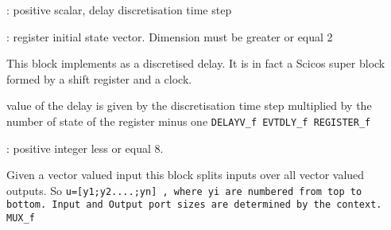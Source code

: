 %
%


\label{DELAYf}

\begin{scitem}
\item[{\verb?Discretisation time step?}]
: positive scalar, delay discretisation time step
\item[{\verb?Register initial state?}]
: register initial state vector. Dimension must be greater or equal
2
\end{scitem}%
This block implements as a discretised delay. It is in fact a Scicos
super block formed by a shift register and a clock.

value of the delay is given by  the discretisation time step multiplied by the
number of state of the register minus one 
{\verb?DELAYV_f EVTDLY_f REGISTER_f?} \pageref{DELAYVfEVTDLYfREGISTERf}
%
%


\label{DEMUXf}

\begin{scitem}
\item[{\verb?number of output ports?}]
:
positive integer less or equal 8.
\end{scitem}%
Given a vector valued input this block splits inputs over all vector
valued outputs. So %
\tt u=[y1;y2....;yn]%
\rm , where %
\tt yi %
\rm are numbered
from top to bottom. Input and Output port sizes are determined by the
context.
{\verb?MUX_f?} \pageref{MUXf}
%
%


\label{DLRADAPTf}

